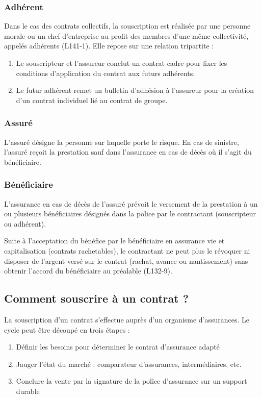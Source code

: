 \documentclass{article}
\begin{document}
\subsubsection{Adhérent}
Dans le cas des contrats collectifs, la souscription est réalisée par une personne morale ou un chef d'entreprise au profit des membres d'une même collectivité, appelés adhérents (L141-1). Elle repose sur une relation tripartite :
\begin{enumerate}
    \item Le souscripteur et l'assureur conclut un contrat cadre pour fixer les conditions d'application du contrat aux futurs adhérents.
    \item Le futur adhérent remet un bulletin d'adhésion à l'assureur pour la création d'un contrat individuel lié au contrat de groupe.
\end{enumerate}

\subsubsection{Assuré}
L'assuré désigne la personne sur laquelle porte le risque. En cas de sinistre, l'assuré reçoit la prestation sauf dans l'assurance en cas de décès où il s'agit du bénéficiaire.

\subsubsection{Bénéficiaire}
L'assurance en cas de décès de l'assuré prévoit le versement de la prestation à un ou plusieurs bénéficiaires désignés dans la police par le contractant (souscripteur ou adhérent).

Suite à l'acceptation du bénéfice par le bénéficiaire en assurance vie et capitalisation (contrats rachetables), le contractant ne peut plus le révoquer ni disposer de l'argent versé sur le contrat (rachat, avance ou nantissement) sans obtenir l'accord du bénéficiaire au préalable (L132-9).

\subsection{Comment souscrire à un contrat ?}
La souscription d'un contrat s'effectue auprès d'un organisme d'assurances. Le cycle peut être découpé en trois étapes :
\begin{enumerate}
    \item Définir les besoins pour déterminer le contrat d'assurance adapté
    \item Jauger l'état du marché : comparateur d'assurances, intermédiaires, etc.
    \item Conclure la vente par la signature de la police d'assurance sur un support durable
\end{enumerate}
\end{document}
